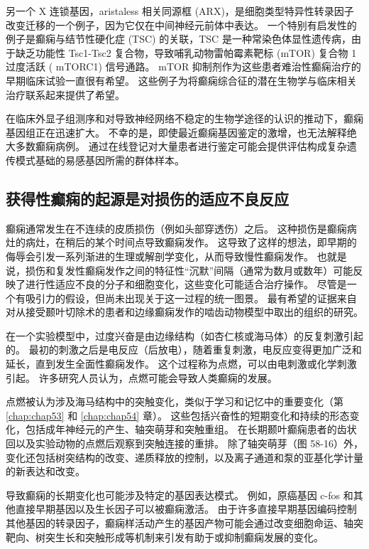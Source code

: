 另一个 X 连锁基因，aristaless 相关同源框 (ARX)，是细胞类型特异性转录因子改变迁移的一个例子，因为它仅在中间神经元前体中表达。
一个特别有启发性的例子是癫痫与结节性硬化症 (TSC) 的关联，TSC 是一种常染色体显性遗传病，由于缺乏功能性 Tsc1-Tsc2 复合物，导致哺乳动物雷帕霉素靶标 (mTOR) 复合物 1 过度活跃 ( mTORC1) 信号通路。
mTOR 抑制剂作为这些患者难治性癫痫治疗的早期临床试验一直很有希望。
这些例子为将癫痫综合征的潜在生物学与临床相关治疗联系起来提供了希望。


在临床外显子组测序和对导致神经网络不稳定的生物学途径的认识的推动下，癫痫基因组正在迅速扩大。
不幸的是，即使最近癫痫基因鉴定的激增，也无法解释绝大多数癫痫病例。
通过在线登记对大量患者进行鉴定可能会提供评估构成复杂遗传模式基础的易感基因所需的群体样本。



\subsection{获得性癫痫的起源是对损伤的适应不良反应}

癫痫通常发生在不连续的皮质损伤（例如头部穿透伤）之后。
这种损伤是癫痫病灶的病灶，在稍后的某个时间点导致癫痫发作。
这导致了这样的想法，即早期的侮辱会引发一系列渐进的生理或解剖学变化，从而导致慢性癫痫发作。
也就是说，损伤和复发性癫痫发作之间的特征性“沉默”间隔（通常为数月或数年）可能反映了进行性适应不良的分子和细胞变化，这些变化可能适合治疗操作。
尽管是一个有吸引力的假设，但尚未出现关于这一过程的统一图景。
最有希望的证据来自对从接受颞叶切除术的患者和边缘癫痫发作的啮齿动物模型中取出的组织的研究。


在一个实验模型中，过度兴奋是由边缘结构（如杏仁核或海马体）的反复刺激引起的。
最初的刺激之后是电反应（后放电），随着重复刺激，电反应变得更加广泛和延长，直到发生全面性癫痫发作。
这个过程称为点燃，可以由电刺激或化学刺激引起。
许多研究人员认为，点燃可能会导致人类癫痫的发展。


点燃被认为涉及海马结构中的突触变化，类似于学习和记忆中的重要变化（第 \ref{chap:chap53} 和 \ref{chap:chap54} 章）。
这些包括兴奋性的短期变化和持续的形态变化，包括成年神经元的产生、轴突萌芽和突触重组。
在长期颞叶癫痫患者的齿状回以及实验动物的点燃后观察到突触连接的重排。
除了轴突萌芽（图 58-16）外，变化还包括树突结构的改变、递质释放的控制，以及离子通道和泵的亚基化学计量的新表达和改变。


导致癫痫的长期变化也可能涉及特定的基因表达模式。
例如，原癌基因 c-fos 和其他直接早期基因以及生长因子可以被癫痫激活。
由于许多直接早期基因编码控制其他基因的转录因子，癫痫样活动产生的基因产物可能会通过改变细胞命运、轴突靶向、树突生长和突触形成等机制来引发有助于或抑制癫痫发展的变化。



